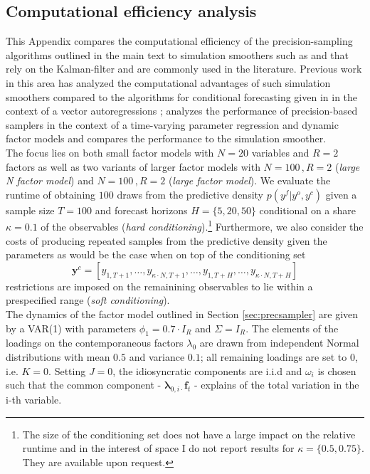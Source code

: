 \documentclass[notitlepage,a4paper,12pt]{article}
\begin{document}
\begin{ThreePartTable}
\section{Computational efficiency analysis}\label{app:simulation}

This Appendix compares the computational efficiency of the precision-sampling algorithms outlined in the main text to simulation smoothers such as \citet{carterkohn1994_biomtr} and \citet{durbinkoopman2002_biomtr} that rely on the Kalman-filter and are commonly used in the literature. Previous work in this area has analyzed the computational advantages of such simulation smoothers compared to the algorithms for conditional forecasting given in \citet{waggonerzha1999_res} in the context of a vector autoregressions \citep{bgl_2015ijf}; \citet{mmp2011_csda} analyzes the performance of precision-based samplers in the context of a time-varying parameter regression and dynamic factor models and compares the performance to the \citet{durbinkoopman2002_biomtr} simulation smoother.\\

The focus lies on both small factor models with $N=20$ variables and $R=2$ factors as well as two variants of larger factor models with $N=100\,,R=2$ (\textit{large N factor model}) and $N=100\,,R=2$ (\textit{large factor model}).  We evaluate the runtime of obtaining $100$ draws from the predictive density $p(y^f|y^o, y^c)$ given a sample size $T=100$ and forecast horizons $H = \{5, 20, 50\}$ conditional on a share $\kappa = 0.1$ of the observables (\textit{hard conditioning}).\footnote{The size of the conditioning set does not have a large impact on the relative runtime and in the interest of space I do not report results for $\kappa = \{0.5, 0.75\}$. They are available upon request.} Furthermore, we also consider the costs of producing repeated samples from the predictive density given the parameters as would be the case when on top of the conditioning set $$\mathbf{y}^{c} = [y_{1, T+1}, \dots, y_{\kappa \cdot N, T+1}, \dots, y_{1,T+H}, \dots, y_{\kappa \cdot N, T+H}]$$ restrictions are imposed on the remainining observables to lie within a prespecified range (\textit{soft conditioning}).\\ 

The dynamics of the factor model outlined in Section \ref{sec:precsampler} are given by a VAR(1) with parameters $\phi_1 = 0.7 \cdot I_R$ and $\Sigma = I_R$. The elements of the loadings on the contemporaneous factors $\lambda_0$ are drawn from independent Normal distributions with mean $0.5$ and variance $0.1$; all remaining loadings are set to 0, i.e. $K=0$. Setting $J=0$, the idiosyncratic components are i.i.d and $\omega_i$ is chosen such that the common component - $\boldsymbol{\lambda}_{0,i\cdot} \mathbf{f}_t$ - explains  of the total variation in the i-th variable. \\


\end{ThreePartTable}
\end{document}

